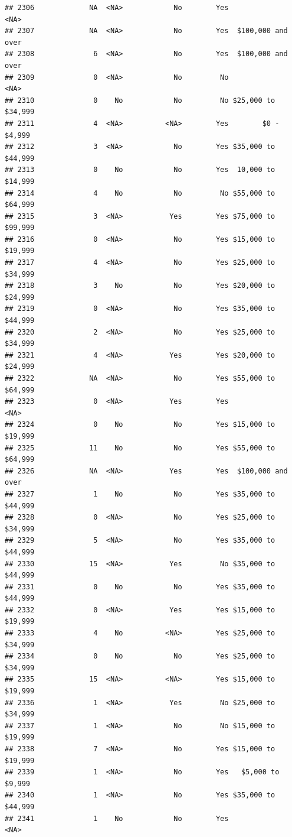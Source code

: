 \documentclass[man]{apa6}
\begin{document}
\begin{verbatim}
## 2306             NA  <NA>            No        Yes               <NA>
## 2307             NA  <NA>            No        Yes  $100,000 and over
## 2308              6  <NA>            No        Yes  $100,000 and over
## 2309              0  <NA>            No         No               <NA>
## 2310              0    No            No         No $25,000 to $34,999
## 2311              4  <NA>          <NA>        Yes        $0 - $4,999
## 2312              3  <NA>            No        Yes $35,000 to $44,999
## 2313              0    No            No        Yes  10,000 to $14,999
## 2314              4    No            No         No $55,000 to $64,999
## 2315              3  <NA>           Yes        Yes $75,000 to $99,999
## 2316              0  <NA>            No        Yes $15,000 to $19,999
## 2317              4  <NA>            No        Yes $25,000 to $34,999
## 2318              3    No            No        Yes $20,000 to $24,999
## 2319              0  <NA>            No        Yes $35,000 to $44,999
## 2320              2  <NA>            No        Yes $25,000 to $34,999
## 2321              4  <NA>           Yes        Yes $20,000 to $24,999
## 2322             NA  <NA>            No        Yes $55,000 to $64,999
## 2323              0  <NA>           Yes        Yes               <NA>
## 2324              0    No            No        Yes $15,000 to $19,999
## 2325             11    No            No        Yes $55,000 to $64,999
## 2326             NA  <NA>           Yes        Yes  $100,000 and over
## 2327              1    No            No        Yes $35,000 to $44,999
## 2328              0  <NA>            No        Yes $25,000 to $34,999
## 2329              5  <NA>            No        Yes $35,000 to $44,999
## 2330             15  <NA>           Yes         No $35,000 to $44,999
## 2331              0    No            No        Yes $35,000 to $44,999
## 2332              0  <NA>           Yes        Yes $15,000 to $19,999
## 2333              4    No          <NA>        Yes $25,000 to $34,999
## 2334              0    No            No        Yes $25,000 to $34,999
## 2335             15  <NA>          <NA>        Yes $15,000 to $19,999
## 2336              1  <NA>           Yes         No $25,000 to $34,999
## 2337              1  <NA>            No         No $15,000 to $19,999
## 2338              7  <NA>            No        Yes $15,000 to $19,999
## 2339              1  <NA>            No        Yes   $5,000 to $9,999
## 2340              1  <NA>            No        Yes $35,000 to $44,999
## 2341              1    No            No        Yes               <NA>

\end{verbatim}
\end{document}
